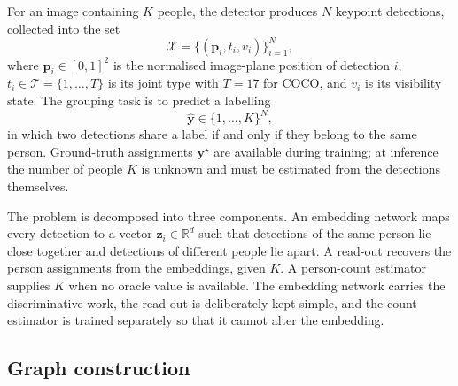 For an image containing $K$ people, the detector produces $N$ keypoint detections, collected into the set
\begin{equation}
    \mathcal{X}
    = \bigl\{(\mathbf{p}_i, t_i, v_i)\bigr\}_{i=1}^{N},
    \label{eq:detections}
\end{equation}
where $\mathbf{p}_i \in [0,1]^2$ is the normalised image-plane position of detection $i$,
$t_i \in \mathcal{T} = \{1,\dots,T\}$ is its joint type with $T=17$ for COCO,
and $v_i$ is its visibility state.
The grouping task is to predict a labelling
\begin{equation}
    \hat{\mathbf{y}} \in \{1,\dots,K\}^{N},
    \label{eq:labelling}
\end{equation}
in which two detections share a label if and only if they belong to the same person.
Ground-truth assignments $\mathbf{y}^{\star}$ are available during training;
at inference the number of people $K$ is unknown and must be estimated from the detections themselves.

The problem is decomposed into three components.
An embedding network maps every detection to a vector $\mathbf{z}_i \in \mathbb{R}^{d}$ such that detections of the same
person lie close together and detections of different people lie apart.
A read-out recovers the person assignments from the embeddings, given $K$.
A person-count estimator supplies $K$ when no oracle value is available.
The embedding network carries the discriminative work, the read-out is deliberately kept simple,
and the count estimator is trained separately so that it cannot alter the embedding.

\subsection{Graph construction}
\label{sec:method_graph}

